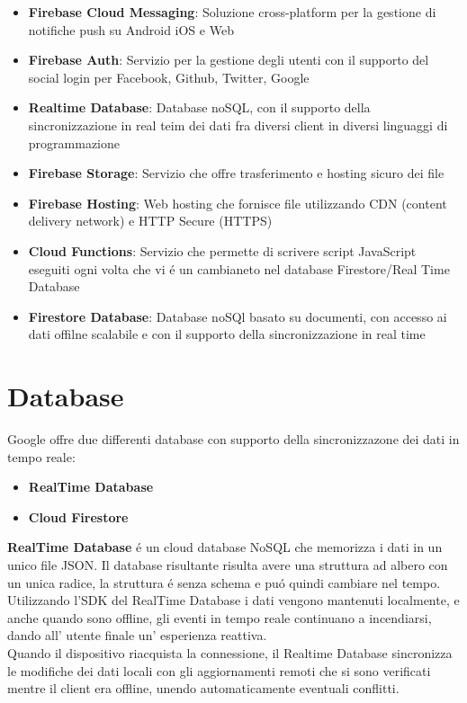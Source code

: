 \begin{itemize}                         %
\item \textbf{Firebase Cloud Messaging}: Soluzione cross-platform per la gestione di notifiche push su Android iOS e Web

\item \textbf{Firebase Auth}: Servizio per la gestione degli utenti con il supporto del social login per Facebook, Github, Twitter, Google

\item \textbf{Realtime Database}: Database noSQL, con il supporto della sincronizzazione in real teim dei dati fra diversi client in diversi linguaggi di programmazione

\item \textbf{Firebase Storage}: Servizio che offre trasferimento e hosting sicuro dei file

\item \textbf{Firebase Hosting}: Web hosting che fornisce file utilizzando CDN (content delivery network) e HTTP Secure (HTTPS)


\item \textbf{Cloud Functions}: Servizio che permette di scrivere script JavaScript eseguiti ogni volta che vi \'e un cambianeto nel database Firestore/Real Time Database

\item \textbf{Firestore Database}: Database noSQl basato su documenti, con accesso ai dati offilne scalabile e con il supporto della sincronizzazione in real time
\end{itemize}



\section{Database}                 %
Google offre due differenti database con supporto della sincronizzazone dei dati in tempo reale:

\begin{itemize}
  \item \textbf{RealTime Database}
  \item \textbf{Cloud Firestore}
\end{itemize}


\textbf{RealTime Database} \'e un cloud database NoSQL che memorizza i dati in un unico file JSON. Il database risultante risulta avere una struttura ad albero con un unica radice, la struttura \'e senza schema e pu\'o quindi cambiare nel tempo.\\
Utilizzando l'SDK del RealTime Database i dati vengono mantenuti localmente, e anche quando sono offline, gli eventi in tempo reale continuano a incendiarsi, dando all' utente finale un' esperienza reattiva.\\ Quando il dispositivo riacquista la connessione, il Realtime Database sincronizza le modifiche dei dati locali con gli aggiornamenti remoti che si sono verificati mentre il client era offline, unendo automaticamente eventuali conflitti.


